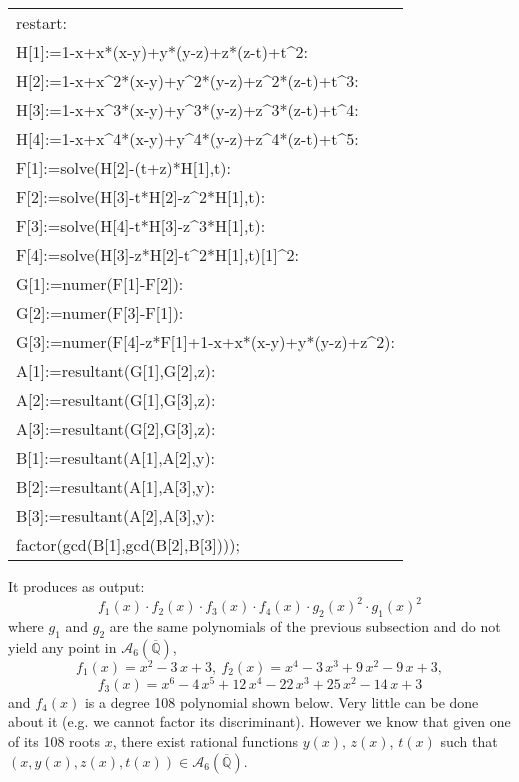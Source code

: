 \documentclass[a4paper,twoside]{article}
\begin{document}
\begin{tt}
\begin{tabular}{l}
restart:\\
H[1]:=1-x+x*(x-y)+y*(y-z)+z*(z-t)+t\^{}2:\\
H[2]:=1-x+x\^{}2*(x-y)+y\^{}2*(y-z)+z\^{}2*(z-t)+t\^{}3:\\
H[3]:=1-x+x\^{}3*(x-y)+y\^{}3*(y-z)+z\^{}3*(z-t)+t\^{}4:\\
H[4]:=1-x+x\^{}4*(x-y)+y\^{}4*(y-z)+z\^{}4*(z-t)+t\^{}5:\\
F[1]:=solve(H[2]-(t+z)*H[1],t):\\
F[2]:=solve(H[3]-t*H[2]-z\^{}2*H[1],t):\\
F[3]:=solve(H[4]-t*H[3]-z\^{}3*H[1],t):\\
F[4]:=solve(H[3]-z*H[2]-t\^{}2*H[1],t)[1]\^{}2:\\
G[1]:=numer(F[1]-F[2]):\\
G[2]:=numer(F[3]-F[1]):\\
G[3]:=numer(F[4]-z*F[1]+1-x+x*(x-y)+y*(y-z)+z\^{}2):\\
A[1]:=resultant(G[1],G[2],z):\\
A[2]:=resultant(G[1],G[3],z):\\
A[3]:=resultant(G[2],G[3],z):\\
B[1]:=resultant(A[1],A[2],y):\\
B[2]:=resultant(A[1],A[3],y):\\
B[3]:=resultant(A[2],A[3],y):\\
factor(gcd(B[1],gcd(B[2],B[3])));
\end{tabular}
\end{tt}

It produces as output:
$$f_1(x)\cdot f_2(x)\cdot f_3(x)\cdot f_4(x)\cdot g_2(x)^2 \cdot g_1(x)^2$$
where $g_1$ and $g_2$ are the same polynomials of the previous
subsection and do not yield any point in $\mathcal
A_6(\overline{\mathbb Q})$,
$$f_1(x)={x}^{2}-3\,x+3,\ f_2(x)={x}^{4}-3\,{x}^{3}+9\,{x}^{2}-9\,x
+3,$$
$$f_3(x)={x}^{6}-4\,{x}^{5}+12\,{x}^{4}-22\,{x}^{3}+25\,{x}^{2}-14\,x+3$$
and $f_4(x)$ is a degree 108 polynomial shown below. Very little
can be done about it (e.g. we cannot factor its discriminant).
However we know that given one of its 108 roots $x$, there exist
rational functions $y(x)$, $z(x)$, $t(x)$ such that
$(x,y(x),z(x),t(x))\in\mathcal A_6(\overline{\mathbb Q})$.
\end{document}
